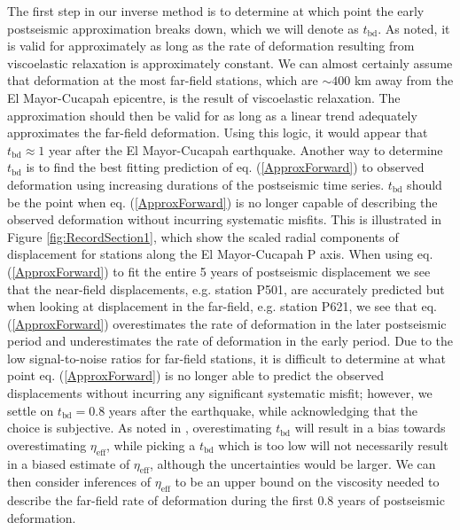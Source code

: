\documentclass[review]{elsarticle}
\begin{document}
The first step in our inverse method is to determine at which point the early postseismic approximation breaks down, which we will denote as $t_{\mathrm{bd}}$.  As noted, it is valid for approximately as long as the rate of deformation resulting from viscoelastic relaxation is approximately constant. We can almost certainly assume that deformation at the most far-field stations, which are $\sim400$ km away from the El Mayor-Cucapah epicentre, is the result of viscoelastic relaxation. The approximation should then be valid for as long as a linear trend adequately approximates the far-field deformation. Using this logic, it would appear that $t_{\mathrm{bd}}\approx1$ year after the El Mayor-Cucapah earthquake.  Another way to determine $t_{\mathrm{bd}}$ is to find the best fitting prediction of eq. (\ref{ApproxForward}) to observed deformation using increasing durations of the postseismic time series.  $t_\mathrm{bd}$ should be the point when eq. (\ref{ApproxForward}) is no longer capable of describing the observed deformation without incurring systematic misfits.  This is illustrated in Figure \ref{fig:RecordSection1}, which show the scaled radial components of displacement for stations along the El Mayor-Cucapah P axis.  When using eq. (\ref{ApproxForward}) to fit the entire 5 years of postseismic displacement we see that the near-field displacements, e.g. station P501, are accurately predicted but when looking at displacement in the far-field, e.g. station P621, we see that eq. (\ref{ApproxForward}) overestimates the rate of deformation in the later postseismic period and underestimates the rate of deformation in the early period.  Due to the low signal-to-noise ratios for far-field stations, it is difficult to determine at what point eq. (\ref{ApproxForward}) is no longer able to predict the observed displacements without incurring any significant systematic misfit; however, we settle on $t_{\mathrm{bd}}=0.8$ years after the earthquake, while acknowledging that the choice is subjective. As noted in \citet{Hines2016}, overestimating $t_{\mathrm{bd}}$ will result in a bias towards overestimating $\eta_{\mathrm{eff}}$, while picking a $t_\mathrm{bd}$ which is too low will not necessarily result in a biased estimate of $\eta_\mathrm{eff}$, although the uncertainties would be larger. We can then consider inferences of $\eta_{\mathrm{eff}}$ to be an upper bound on the viscosity needed to describe the far-field rate of deformation during the first 0.8 years of postseismic deformation. 
\end{document}
